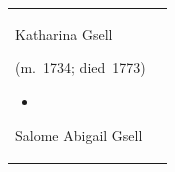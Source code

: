 \begin{longtable}[]{@{}
  >{\raggedright\arraybackslash}p{}
  >{\raggedright\arraybackslash}p{}@{}}
\begin{minipage}[t]{\linewidth}
Katharina Gsell

{\hspace{0pt}}

{ }

{\hspace{0pt}}

{(}{m.}{~}1734{;}{ }died{~}1773{)}{\hspace{0pt}}

\begin{itemize}
\tightlist
\item
\end{itemize}

Salome Abigail Gsell

{\hspace{0pt}}

{ }

{\hspace{0pt}}


\end{minipage}
\end{longtable}
